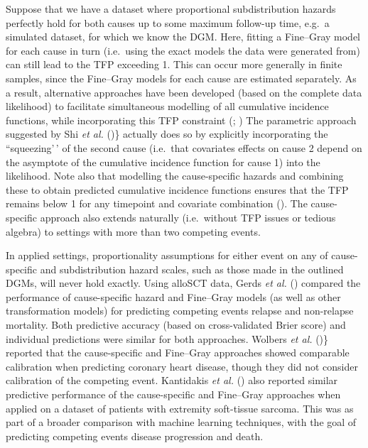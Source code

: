 \documentclass[
  letterpaper,
  paper=240mm:170mm,
  twoside=true,
  open=right,
  fontsize=10pt,
  pagesize=false,
  BCOR=15mm,
  DIV=14,
  headinclude=true,
  footinclude=false,
  headsepline=on]{scrbook}
\begin{document}
Suppose that we have a dataset where proportional subdistribution
hazards perfectly hold for both causes up to some maximum follow-up
time, e.g.~a simulated dataset, for which we know the DGM. Here, fitting
a Fine--Gray model for each cause in turn (i.e.~using the exact models
the data were generated from) can still lead to the TFP exceeding 1.
This can occur more generally in finite samples, since the Fine--Gray
models for each cause are estimated separately. As a result, alternative
approaches have been developed (based on the complete data likelihood)
to facilitate simultaneous modelling of all cumulative incidence
functions, while incorporating this TFP constraint
(; ) The parametric approach suggested by Shi \emph{et al.}
()\} actually does
so by explicitly incorporating the ``squeezing'\,' of the second cause
(i.e.~that covariates effects on cause 2 depend on the asymptote of the
cumulative incidence function for cause 1) into the likelihood. Note
also that modelling the cause-specific hazards and combining these to
obtain predicted cumulative incidence functions ensures that the TFP
remains below 1 for any timepoint and covariate combination
(). The cause-specific approach also extends naturally
(i.e.~without TFP issues or tedious algebra) to settings with more than
two competing events.

In applied settings, proportionality assumptions for either event on any
of cause-specific and subdistribution hazard scales, such as those made
in the outlined DGMs, will never hold exactly. Using alloSCT data, Gerds
\emph{et al.} ()
compared the performance of cause-specific hazard and Fine--Gray models
(as well as other transformation models) for predicting competing events
relapse and non-relapse mortality. Both predictive accuracy (based on
cross-validated Brier score) and individual predictions were similar for
both approaches. Wolbers \emph{et al.}
()\} reported
that the cause-specific and Fine--Gray approaches showed comparable
calibration when predicting coronary heart disease, though they did not
consider calibration of the competing event. Kantidakis \emph{et al.}
() also
reported similar predictive performance of the cause-specific and
Fine--Gray approaches when applied on a dataset of patients with
extremity soft-tissue sarcoma. This was as part of a broader comparison
with machine learning techniques, with the goal of predicting competing
events disease progression and death.
\end{document}
